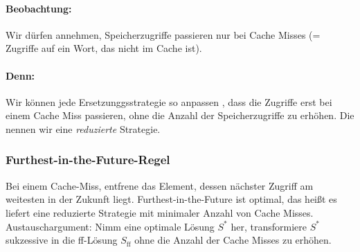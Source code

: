 \paragraph*{Beobachtung:} Wir dürfen annehmen, Speicherzugriffe passieren nur bei Cache Misses (= Zugriffe auf ein Wort, das nicht im Cache ist).
\paragraph*{Denn:} Wir können jede Ersetzunggsstrategie so anpassen , dass die Zugriffe erst bei einem Cache Miss passieren, ohne die Anzahl der Speicherzugriffe zu erhöhen. Die nennen wir eine \emph{reduzierte} Strategie.
\subsubsection{Furthest-in-the-Future-Regel}
Bei einem Cache-Miss, entfrene das Element, dessen nächster Zugriff am weitesten in der Zukunft liegt.
\Satz Furthest-in-the-Future ist optimal, das heißt es liefert eine reduzierte Strategie mit minimaler Anzahl von Cache Misses.
\Bew Austauschargument: Nimm eine optimale Lösung $S^*$ her, transformiere $S^*$ sukzessive in die ff-Lösung $S_{\text{ff}}$ ohne die Anzahl der Cache Misses zu erhöhen.
